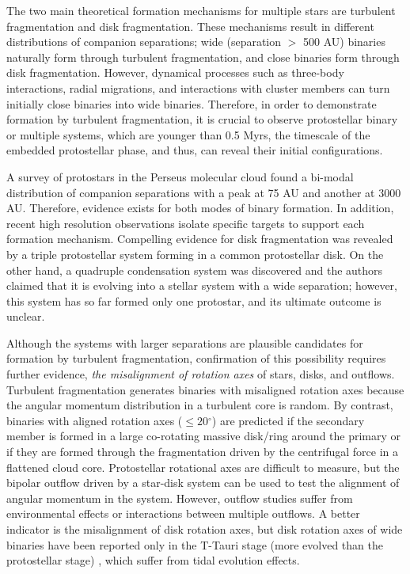 \documentclass{nature}
\newcommand{\degree}{\mbox{$^\circ$}}
\begin{document}
The two main theoretical formation mechanisms for multiple stars are turbulent fragmentation and disk fragmentation.
These mechanisms result in different distributions of companion separations; wide (separation $>$ 500 AU) binaries naturally form
through turbulent fragmentation\cite{Offner2010}, and close binaries form through disk fragmentation\cite{Kratter2010}.
However, dynamical processes
such as three-body interactions, radial migrations,
and interactions with cluster members\cite{Bate2012,Offner2010,Marks2012}
can turn initially close binaries into wide binaries.
Therefore, in order to demonstrate formation by turbulent fragmentation,
it is crucial to observe protostellar binary or multiple systems,
which are younger than 0.5 Myrs, 
the timescale of the embedded protostellar phase\cite{Dunham2014}, 
and thus, can reveal their initial configurations.

A survey of protostars in the Perseus molecular cloud
found a bi-modal distribution of companion separations
with a peak at 75 AU and another at 3000 AU\cite{Tobin2016}. 
Therefore, evidence exists for both modes of binary formation.
In addition, recent high resolution observations isolate specific targets to support each formation mechanism.
Compelling evidence for disk fragmentation was revealed by a triple
protostellar system forming in a common protostellar disk\cite{Tobin2016b}.
On the other hand, a quadruple condensation system was discovered
and the authors claimed that it is evolving into a stellar system with a wide separation\cite{Pineda2015};
however, this system has so far formed only one protostar, and its ultimate outcome is unclear.

Although the systems with larger separations
are plausible candidates for formation by turbulent fragmentation,
confirmation of this possibility requires further evidence,  {\it the misalignment of rotation axes} of stars, disks, and outflows\cite{Offner2016}.
Turbulent fragmentation generates binaries with misaligned rotation axes
because the angular momentum distribution in a turbulent core
is random\cite{Offner2010}.
By contrast, binaries with aligned rotation axes ($\le 20\degree$)\cite{Offner2016} are predicted
if the secondary member is formed in a large co-rotating massive disk/ring
around the primary\cite{Bonnell1994}
or if they are formed through the fragmentation
driven by the centrifugal force in a flattened cloud core.
 Protostellar rotational axes are difficult to measure, but the bipolar outflow driven by a star-disk system
can be used to test the alignment of angular momentum in the system\cite{Offner2016}. 
However, outflow studies suffer from environmental effects\cite{Lee2017} or interactions between multiple outflows. 
A better indicator is the misalignment of disk rotation axes, but disk rotation axes of wide binaries 
have been reported only in the T-Tauri stage (more evolved than the protostellar stage)
\cite{Jensen2004,Jensen2014,Salyk2014,Williams2014},
which suffer from tidal evolution  effects.
\end{document}
